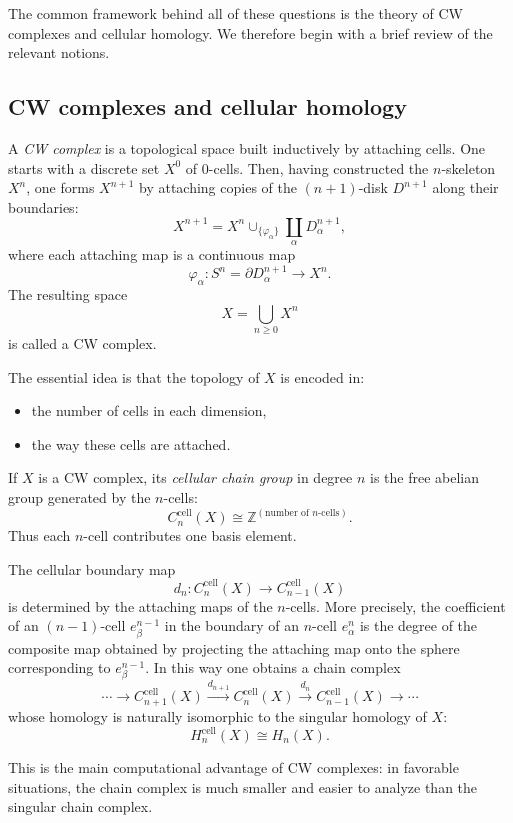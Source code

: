 \documentclass[12pt,a4paper]{article}
\theoremstyle{notespace}
\begin{document}
The common framework behind all of these questions is the theory of CW complexes and cellular homology. We therefore begin with a brief review of the relevant notions.

\subsection{CW complexes and cellular homology}

A \emph{CW complex} is a topological space built inductively by attaching cells. One starts with a discrete set \(X^0\) of \(0\)-cells. Then, having constructed the \(n\)-skeleton \(X^n\), one forms \(X^{n+1}\) by attaching copies of the \((n+1)\)-disk \(D^{n+1}\) along their boundaries:
\[
X^{n+1}
=
X^n \cup_{\{\varphi_\alpha\}} \coprod_{\alpha} D^{n+1}_\alpha,
\]
where each attaching map is a continuous map
\[
\varphi_\alpha : S^n = \partial D^{n+1}_\alpha \longrightarrow X^n.
\]
The resulting space
\[
X=\bigcup_{n\ge 0} X^n
\]
is called a CW complex.

The essential idea is that the topology of \(X\) is encoded in:
\begin{itemize}
	\item the number of cells in each dimension,
	\item the way these cells are attached.
\end{itemize}

If \(X\) is a CW complex, its \emph{cellular chain group} in degree \(n\) is the free abelian group generated by the \(n\)-cells:
\[
C_n^{\mathrm{cell}}(X)\cong \mathbb Z^{(\text{number of \(n\)-cells})}.
\]
Thus each \(n\)-cell contributes one basis element.

The cellular boundary map
\[
d_n:C_n^{\mathrm{cell}}(X)\to C_{n-1}^{\mathrm{cell}}(X)
\]
is determined by the attaching maps of the \(n\)-cells. More precisely, the coefficient of an \((n-1)\)-cell \(e^{n-1}_\beta\) in the boundary of an \(n\)-cell \(e^n_\alpha\) is the degree of the composite map obtained by projecting the attaching map onto the sphere corresponding to \(e^{n-1}_\beta\). In this way one obtains a chain complex
\[
\cdots \longrightarrow C_{n+1}^{\mathrm{cell}}(X)
\overset{d_{n+1}}{\longrightarrow}
C_n^{\mathrm{cell}}(X)
\overset{d_n}{\longrightarrow}
C_{n-1}^{\mathrm{cell}}(X)
\longrightarrow \cdots
\]
whose homology is naturally isomorphic to the singular homology of \(X\):
\[
H_n^{\mathrm{cell}}(X)\cong H_n(X).
\]

This is the main computational advantage of CW complexes: in favorable situations, the chain complex is much smaller and easier to analyze than the singular chain complex.
\end{document}
